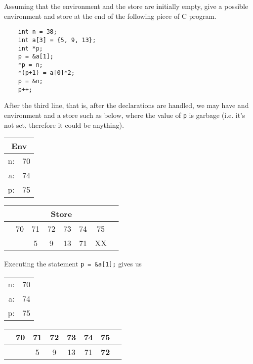 \documentclass[addpoints]{exam}
\begin{document}
\begin{questions}
  \newpage
  \question
  Assuming that the environment and the store are initially empty,
  give a possible environment and store at the
  end of the following piece of C program.
  \begin{verbatim}
    int n = 38;
    int a[3] = {5, 9, 13};
    int *p;
    p = &a[1];
    *p = n;
    *(p+1) = a[0]*2;
    p = &n;
    p++;
  \end{verbatim}

  \begin{solution}
    After the third line, that is, after the declarations are handled, we may have
    and environment and a store such as below, where the value of \texttt{p} is
    garbage (i.e. it's not set, therefore it could be anything). 
    
    \begin{tabular}{|r c|}
      \multicolumn{2}{c}{Env}\\\hline
      n: & 70 \\
      a: & 74 \\
      p: & 75 \\
      \hline
    \end{tabular}
    \hspace{1cm}
    \begin{tabular}{c|c|c|c|c|c|c|c}
      \multicolumn{8}{c}{Store}\\
      \hline
      \multicolumn{1}{c}{} & \multicolumn{1}{c}{70} & \multicolumn{1}{c}{71} & \multicolumn{1}{c}{72} & \multicolumn{1}{c}{73} & \multicolumn{1}{c}{74} & \multicolumn{1}{c}{75} & \\\hline
      &  \bigstrut 38 &  5 &  9 & 13 & 71 & XX & \\[1ex]\hline
    \end{tabular}

    Executing the statement \texttt{p = &a[1];} gives us

    \begin{tabular}{|r c|}
      \hline
      n: & 70 \\
      a: & 74 \\
      p: & 75 \\
      \hline
    \end{tabular}
    \hspace{1cm}
    \begin{tabular}{c|c|c|c|c|c|c|c}
      \hline
      \multicolumn{1}{c}{} & \multicolumn{1}{c}{70} & \multicolumn{1}{c}{71} & \multicolumn{1}{c}{72} & \multicolumn{1}{c}{73} & \multicolumn{1}{c}{74} & \multicolumn{1}{c}{75} & \\\hline
      &  \bigstrut 38 &  5 &  9 & 13 & 71 & \textbf{72} & \\[1ex]\hline
    \end{tabular}
    

\end{solution}
\end{questions}
\end{document}
